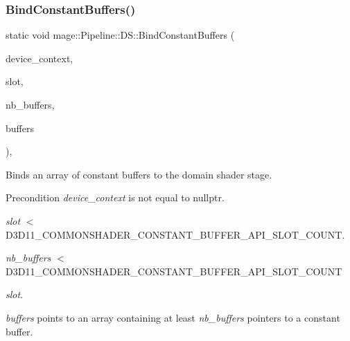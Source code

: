 \subsubsection{\texorpdfstring{Bind\+Constant\+Buffers()}{BindConstantBuffers()}}
{\footnotesize\ttfamily static void mage\+::\+Pipeline\+::\+D\+S\+::\+Bind\+Constant\+Buffers (\begin{DoxyParamCaption}\item[{I\+D3\+D11\+Device\+Context4 $\ast$}]{device\+\_\+context,  }\item[{\hyperlink{namespacemage_a41c104c036fba3756a74e19f793eeaa1}{U32}}]{slot,  }\item[{\hyperlink{namespacemage_a41c104c036fba3756a74e19f793eeaa1}{U32}}]{nb\+\_\+buffers,  }\item[{I\+D3\+D11\+Buffer $\ast$const $\ast$}]{buffers }\end{DoxyParamCaption})\hspace{0.3cm}{\ttfamily [static]}, {\ttfamily [noexcept]}}

Binds an array of constant buffers to the domain shader stage.

\begin{DoxyPrecond}{Precondition}
{\itshape device\+\_\+context} is not equal to {\ttfamily nullptr}. 

{\itshape slot} $<$ {\ttfamily D3\+D11\+\_\+\+C\+O\+M\+M\+O\+N\+S\+H\+A\+D\+E\+R\+\_\+\+C\+O\+N\+S\+T\+A\+N\+T\+\_\+\+B\+U\+F\+F\+E\+R\+\_\+\+A\+P\+I\+\_\+\+S\+L\+O\+T\+\_\+\+C\+O\+U\+NT}. 

{\itshape nb\+\_\+buffers} $<$ {\ttfamily D3\+D11\+\_\+\+C\+O\+M\+M\+O\+N\+S\+H\+A\+D\+E\+R\+\_\+\+C\+O\+N\+S\+T\+A\+N\+T\+\_\+\+B\+U\+F\+F\+E\+R\+\_\+\+A\+P\+I\+\_\+\+S\+L\+O\+T\+\_\+\+C\+O\+U\+NT} 
\begin{DoxyItemize}
\item {\itshape slot}. 
\end{DoxyItemize}

{\itshape buffers} points to an array containing at least {\itshape nb\+\_\+buffers} pointers to a constant buffer. 
\end{DoxyPrecond}

